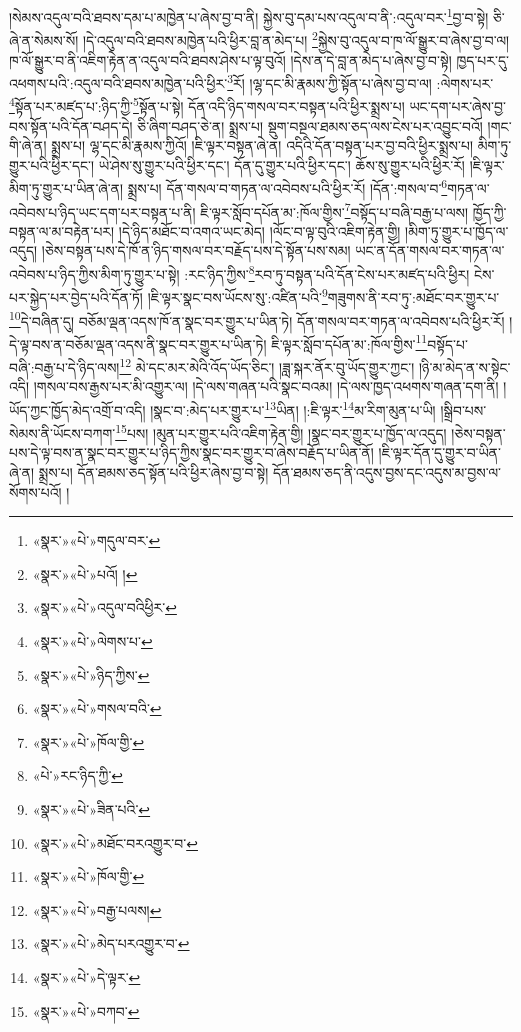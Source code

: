 །སེམས་འདུལ་བའི་ཐབས་དམ་པ་མཁྱེན་པ་ཞེས་བྱ་བ་ནི། སྐྱེས་བུ་དམ་པས་འདུལ་བ་ནི་:འདུལ་བར་\footnote{«སྣར་»«པེ་»གདུལ་བར་}བྱ་བ་སྟེ། ཅི་ཞེ་ན་སེམས་སོ། །དེ་འདུལ་བའི་ཐབས་མཁྱེན་པའི་ཕྱིར་བླ་ན་མེད་པ། \footnote{«སྣར་»«པེ་»པའོ། ། }སྐྱེས་བུ་འདུལ་བ་ཁ་ལོ་སྒྱུར་བ་ཞེས་བྱ་བ་ལ། ཁ་ལོ་སྒྱུར་བ་ནི་འཇིག་རྟེན་ན་འདུལ་བའི་ཐབས་ཤེས་པ་ལྟ་བུའོ། །དེས་ན་དེ་བླ་ན་མེད་པ་ཞེས་བྱ་བ་སྟེ། ཁྱད་པར་དུ་འཕགས་པའི་:འདུལ་བའི་ཐབས་མཁྱེན་པའི་ཕྱིར་\footnote{«སྣར་»«པེ་»འདུལ་བའིཕྱིར་}རོ། །ལྷ་དང་མི་རྣམས་ཀྱི་སྟོན་པ་ཞེས་བྱ་བ་ལ། :ལེགས་པར་\footnote{«སྣར་»«པེ་»ལེགས་པ་}སྟོན་པར་མཛད་པ་:ཉིད་ཀྱི་\footnote{«སྣར་»«པེ་»ཉིད་ཀྱིས་}སྟོན་པ་སྟེ། དོན་འདི་ཉིད་གསལ་བར་བསྟན་པའི་ཕྱིར་སྨྲས་པ། ཡང་དག་པར་ཞེས་བྱ་བས་སྟོན་པའི་དོན་བཤད་དེ། ཅི་ཞིག་བཤད་ཅེ་ན། སྨྲས་པ། སྡུག་བསྔལ་ཐམས་ཅད་ལས་ངེས་པར་འབྱུང་བའོ། །གང་གི་ཞེ་ན། སྨྲས་པ། ལྷ་དང་མི་རྣམས་ཀྱིའོ། །ཇི་ལྟར་བསྟན་ཞེ་ན། འདིའི་དོན་བསྟན་པར་བྱ་བའི་ཕྱིར་སྨྲས་པ། མིག་ཏུ་གྱུར་པའི་ཕྱིར་དང་། ཡེ་ཤེས་སུ་གྱུར་པའི་ཕྱིར་དང་། དོན་དུ་གྱུར་པའི་ཕྱིར་དང་། ཆོས་སུ་གྱུར་པའི་ཕྱིར་རོ། །ཇི་ལྟར་མིག་ཏུ་གྱུར་པ་ཡིན་ཞེ་ན། སྨྲས་པ། དོན་གསལ་བ་གཏན་ལ་འབེབས་པའི་ཕྱིར་རོ། །དོན་:གསལ་བ་\footnote{«སྣར་»«པེ་»གསལ་བའི་}གཏན་ལ་འབེབས་པ་ཉིད་ཡང་དག་པར་བསྟན་པ་ནི། ཇི་ལྟར་སློབ་དཔོན་མ་:ཁོལ་གྱིས་\footnote{«སྣར་»«པེ་»ཁོལ་གྱི་}བསྟོད་པ་བཞི་བརྒྱ་པ་ལས། ཁྱོད་ཀྱི་བསྟན་ལ་མ་བརྟེན་པར། །དེ་ཉིད་མཐོང་བ་འགའ་ཡང་མེད། །ལོང་བ་ལྟ་བུའི་འཇིག་རྟེན་གྱི། །མིག་ཏུ་གྱུར་པ་ཁྱོད་ལ་འདུད། །ཅེས་བསྟན་པས་དེ་ཁོ་ན་ཉིད་གསལ་བར་བརྗོད་པས་དེ་སྟོན་པས་སམ། ཡང་ན་དོན་གསལ་བར་གཏན་ལ་འབེབས་པ་ཉིད་ཀྱིས་མིག་ཏུ་གྱུར་པ་སྟེ། :རང་ཉིད་ཀྱིས་\footnote{«པེ་»རང་ཉིད་ཀྱི་}རབ་ཏུ་བསྟན་པའི་དོན་ངེས་པར་མཛད་པའི་ཕྱིར། ངེས་པར་སྐྱེད་པར་བྱེད་པའི་དོན་ཏོ། །ཇི་ལྟར་སྣང་བས་ཡོངས་སུ་:འཛིན་པའི་\footnote{«སྣར་»«པེ་»ཟིན་པའི་}གཟུགས་ནི་རབ་ཏུ་:མཐོང་བར་གྱུར་པ་\footnote{«སྣར་»«པེ་»མཐོང་བརའགྱུར་བ་}དེ་བཞིན་དུ། བཅོམ་ལྡན་འདས་ཁོ་ན་སྣང་བར་གྱུར་པ་ཡིན་ཏེ། དོན་གསལ་བར་གཏན་ལ་འབེབས་པའི་ཕྱིར་རོ། །དེ་ལྟ་བས་ན་བཅོམ་ལྡན་འདས་ནི་སྣང་བར་གྱུར་པ་ཡིན་ཏེ། ཇི་ལྟར་སློབ་དཔོན་མ་:ཁོལ་གྱིས་\footnote{«སྣར་»«པེ་»ཁོལ་གྱི་}བསྟོད་པ་བཞི་:བརྒྱ་པ་དེ་ཉིད་ལས།\footnote{«སྣར་»«པེ་»བརྒྱ་པལས།} མེ་དང་མར་མེའི་འོད་ཡོད་ཅིང་། །ཟླ་སྐར་ནོར་བུ་ཡོད་གྱུར་ཀྱང་། །ཉི་མ་མེད་ན་ས་སྟེང་འདི། །གསལ་བས་རྒྱས་པར་མི་འགྱུར་ལ། །དེ་ལས་གཞན་པའི་སྣང་བའམ། །དེ་ལས་ཁྱད་འཕགས་གཞན་དག་ནི། །ཡོད་ཀྱང་ཁྱོད་མེད་འགྲོ་བ་འདི། །སྣང་བ་:མེད་པར་གྱུར་པ་\footnote{«སྣར་»«པེ་»མེད་པརའགྱུར་བ་}ཡིན། །:ཇི་ལྟར་\footnote{«སྣར་»«པེ་»དེ་ལྟར་}མ་རིག་མུན་པ་ཡི། །སྒྲིབ་པས་སེམས་ནི་ཡོངས་བཀག་\footnote{«སྣར་»«པེ་»བཀབ་}པས། །མུན་པར་གྱུར་པའི་འཇིག་རྟེན་གྱི། །སྣང་བར་གྱུར་པ་ཁྱོད་ལ་འདུད། །ཅེས་བསྟན་པས་དེ་ལྟ་བས་ན་སྣང་བར་གྱུར་པ་ཉིད་ཀྱིས་སྣང་བར་གྱུར་བ་ཞེས་བརྗོད་པ་ཡིན་ནོ། །ཇི་ལྟར་དོན་དུ་གྱུར་བ་ཡིན་ཞེ་ན། སྨྲས་པ། དོན་ཐམས་ཅད་སྟོན་པའི་ཕྱིར་ཞེས་བྱ་བ་སྟེ། དོན་ཐམས་ཅད་ནི་འདུས་བྱས་དང་འདུས་མ་བྱས་ལ་སོགས་པའོ། །
